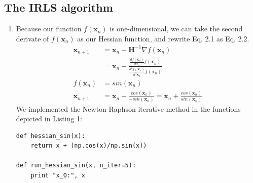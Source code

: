 \documentclass[a4paper,10pt]{article}
\numberwithin{equation}{section} %
\numberwithin{figure}{section} %
\numberwithin{table}{section} %
\theoremstyle{mytheor}
\begin{document}
\subsection{The IRLS algorithm}
\begin{enumerate}
	\item Because our function $f(\boldsymbol{x}_n)$ is one-dimensional, we can take the second derivate of $f(\boldsymbol{x}_n)$ as our Hessian function, and rewrite Eq. 2.1 as Eq. 2.2. 
		\begin{align}
		\boldsymbol{x}_{n+1} &= \boldsymbol{x}_n - \boldsymbol{H}^{-1} \nabla f(\boldsymbol{x}_n)\\
		&= \boldsymbol{x}_n - \frac{\frac{df(\boldsymbol{x}_n)}{dx_n} f(\boldsymbol{x}_n)}{\frac{d^2f(\boldsymbol{x}_n)}{d^2\boldsymbol{x}_n} f(\boldsymbol{x}_n)}\\
		f(\boldsymbol{x}_n) &= sin(\boldsymbol{x}_n)\\
		\boldsymbol{x}_{n+1} &= \boldsymbol{x}_n - \frac{cos(\boldsymbol{x}_n)}{-sin(\boldsymbol{x}_n)} = \boldsymbol{x}_n + \frac{cos(\boldsymbol{x}_n)}{sin(\boldsymbol{x}_n)}
		\end{align}
		We implemented the Newton-Raphson iterative method in the functions depicted in Listing 1:
		\begin{lstlisting}[label={list:first},caption=Python code for function \textit{hessian\_sin(x)} and \textit{run\_hessian\_sin(x, n\_iter=5)}.]
def hessian_sin(x):
    return x + (np.cos(x)/np.sin(x))

def run_hessian_sin(x, n_iter=5):
    print "x_0:", x
    

\end{lstlisting}
\end{enumerate}
\end{document}
